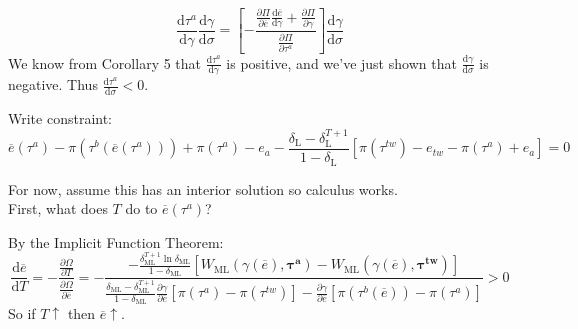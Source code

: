\documentclass[12pt]{article}
\newcommand{\ov}{\overline}
\newcommand{\bta}{\bm{\tau^a}}
\newcommand{\btw}{\bm{\tau^{tw}}}
\newcommand{\ga}{\gamma}
\newcommand{\de}{\delta}
\begin{document}
\begin{equation}
 	\frac{\mathrm{d} \tau^a}{\mathrm{d} \ga} \frac{\mathrm{d} \ga}{\mathrm{d} \sigma} = \left[-\frac{\frac{\partial \Pi}{\partial \ov{e}}\frac{\mathrm{d} \ov{e}}{\mathrm{d} \ga}+\frac{\partial \Pi}{\partial \ga}}{\frac{\partial \Pi}{\partial \tau^a}} \right] \frac{\mathrm{d} \ga}{\mathrm{d} \sigma}
\end{equation}
We know from Corollary 5 that $\frac{\mathrm{d} \tau^a}{\mathrm{d} \ga}$ is positive, and we've just shown that $\frac{\mathrm{d} \ga}{\mathrm{d} \sigma}$ is negative. Thus $\frac{\mathrm{d} \tau^a}{\mathrm{d} \sigma} <0$.

\vskip1in
Write constraint:
\[
  \ov{e}(\tau^a) - \pi(\tau^b(\ov{e}(\tau^a))) + \pi(\tau^a) - e_a - \frac{\de_\text{L} - \de_\text{L}^{T+1}}{1-\de_\text{L}} \left[\pi(\tau^{tw}) - e_{tw} -\pi(\tau^a) + e_a \right] = 0
\]

For now, assume this has an interior solution so calculus works. \\

First, what does $T$ do to $\ov{e}(\tau^a)$?

By the Implicit Function Theorem:
\begin{equation}
 	\frac{\mathrm{d} \ov{e}}{\mathrm{d} T} = -\frac{\frac{\partial \Omega}{\partial T}}{\frac{\partial \Omega}{\partial \ov{e}}} = 
	- \textstyle \frac{- \frac{\de_\text{ML}^{T+1}\ln\de_\text{ML}}{1-\de_\text{ML}}\left[  W_\text{ML}(\ga(\ov{e}),\bta) - W_\text{ML}(\ga(\ov{e}),\btw) \right]} {\frac{\de_\text{ML} - \de_\text{ML}^{T+1}}{1-\de_\text{ML}}\frac{\partial \ga}{\partial \ov{e}}\left[ \pi(\tau^a) - \pi(\tau^{tw}) \right] - \frac{\partial \ga}{\partial \ov{e}}\left[ \pi(\tau^b(\ov{e})) - \pi(\tau^{a}) \right]} > 0
	\label{eq:coret}
\end{equation}
So if $T \uparrow$ then $\ov{e} \uparrow$.
\end{document}
